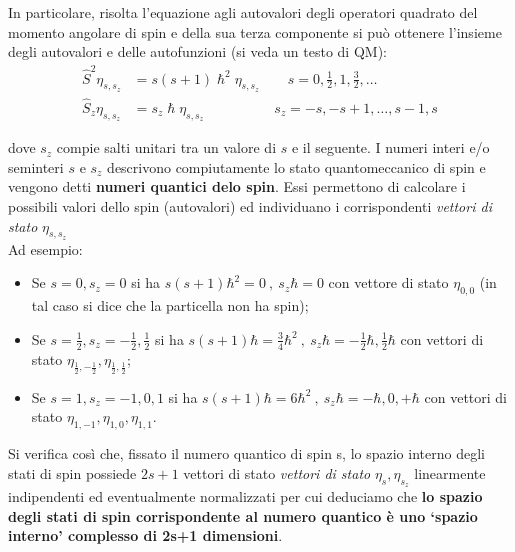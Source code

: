 In particolare, risolta l'equazione agli autovalori degli operatori
quadrato del momento angolare di spin e della sua terza componente si
può ottenere l'insieme degli autovalori e delle autofunzioni (si veda un testo di QM):
\begin{equation}
    \begin{aligned}
        \hat{S}^{2} \eta_{s,s_{z}} &= s (s+1) \hslash^{2} \eta_{s,s_{z}} \qquad s = 0, \frac{1}{2}, 1, \frac{3}{2}, \dots \\
        \hat{S}_{z} \eta_{s,s_{z}} &= s_{z} \hslash \eta_{s,s_{z}} \qquad \qquad \quad s_{z} = -s, -s+1, \dots , s-1, s
    \end{aligned}
    \label{eq:eigenvalue-eq-spin}
\end{equation}

dove \(s_{z}\) compie salti unitari tra un valore di \(s\) e il
seguente.
I numeri interi e/o seminteri $s$ e $s_{z}$ descrivono compiutamente lo stato quantomeccanico di spin e vengono detti \textbf{numeri quantici delo spin}.
Essi permettono di calcolare i possibili valori dello spin (autovalori) ed individuano i corrispondenti \emph{vettori di stato} $\eta_{s,s_{z}}$ \\
Ad esempio:
\begin{itemize}
    \item Se $s = 0,s_{z}=0$ si ha $s(s+1) \hbar^{2} = 0 \ , \ s_{z}\hbar = 0$ con vettore di stato $\eta_{0,0}$ (in tal caso si dice che la particella non ha spin);
    \item Se $s=\frac{1}{2}, s_{z} = -\frac{1}{2}, \frac{1}{2}$ si ha $s(s+1)\hbar = \frac{3}{4} \hbar^{2} \ , \ s_{z}\hbar = -\frac{1}{2}\hbar, \frac{1}{2} \hbar$ con vettori di stato $\eta_{\frac{1}{2} , - \frac{1}{2}} , \eta_{\frac{1}{2}, \frac{1}{2}}$;
    \item Se $s=1 , s_{z} = -1,0,1$ si ha $s(s+1)\hbar = 6\hbar^{2} \ , \ s_{z}\hbar = - \hbar,0, +\hbar$ con vettori di stato $\eta_{1,-1}, \eta_{1,0},\eta_{1,1}$.
\end{itemize}
Si verifica così che, fissato il numero quantico di spin s, lo spazio interno degli stati di spin possiede
$2s+1$ vettori di stato \emph{vettori di stato} $\eta_{s},\eta_{s_{z}}$ linearmente indipendenti ed eventualmente normalizzati per cui deduciamo che \textbf{lo spazio degli stati di spin corrispondente al numero quantico  è uno ‘spazio interno’ complesso di 2s+1 dimensioni}.
\bigskip

